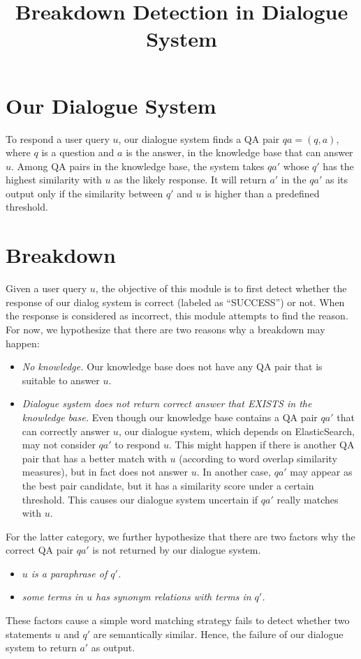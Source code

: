 \documentclass[12pt, letterpaper]{article}
\begin{document}
\title{Breakdown Detection in Dialogue System}
\maketitle
\section{Our Dialogue System}
To respond a user query $u$, our dialogue system finds a QA pair $qa=(q,a)$, where $q$ is a question and $a$ is the answer, in the knowledge base that can answer $u$.
Among QA pairs in the knowledge base, the system takes $qa'$ whose $q'$ has the highest similarity with $u$ as the likely response.
It will return $a'$ in the $qa'$ as its output only if the similarity between $q'$ and $u$ is higher than a predefined threshold.

\section{Breakdown}
Given a user query $u$, the objective of this module is to first detect whether the response of our dialog system is correct (labeled as ``SUCCESS'') or not.
When the response is considered as incorrect, this module attempts to find the reason.
For now, we hypothesize that there are two reasons why a breakdown may happen:
\begin{itemize}
  \item \textit{No knowledge.} 
        Our knowledge base does not have any QA pair that is suitable to answer $u$.
  \item \textit{Dialogue system does not return correct answer that EXISTS in the knowledge base.} 
        Even though our knowledge base contains a QA pair $qa'$ that can correctly answer $u$, our dialogue system, which depends on ElasticSearch, may not consider $qa'$ to respond $u$.
        This might happen if there is another QA pair that has a better match with $u$ (according to word overlap similarity measures), but in fact does not answer $u$. 
        In another case, $qa'$ may appear as the best pair candidate, but it has a similarity score under a certain threshold. This causes our dialogue system uncertain if $qa'$ really matches with $u$.
\end{itemize}

For the latter category, we further hypothesize that there are two factors why the correct QA pair $qa'$ is not returned by our dialogue system.
\begin{itemize}
  \item \textit{$u$ is a paraphrase of $q'$.}
  \item \textit{some terms in $u$ has synonym relations with terms in $q'$.}
\end{itemize}
These factors cause a simple word matching strategy fails to detect whether two statements $u$ and $q'$ are semantically similar.
Hence, the failure of our dialogue system to return $a'$ as output.
\end{document}
